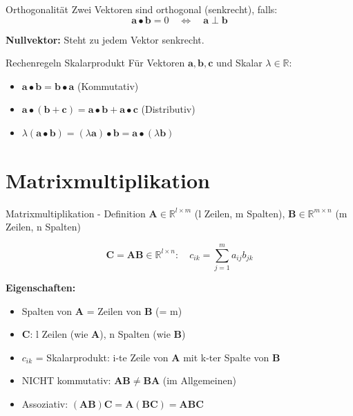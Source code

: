 \documentclass[a4paper, fontsize=7pt]{scrartcl}
\def\R{\mathbb{R}}
\begin{document}
\begin{mainbox}{Orthogonalität}
Zwei Vektoren sind orthogonal (senkrecht), falls:
$$\mathbf{a} \bullet \mathbf{b} = 0 \quad \Leftrightarrow \quad \mathbf{a} \perp \mathbf{b}$$

\textbf{Nullvektor:} Steht zu jedem Vektor senkrecht.
\end{mainbox}

\begin{subbox}{Rechenregeln Skalarprodukt}
Für Vektoren $\mathbf{a}, \mathbf{b}, \mathbf{c}$ und Skalar $\lambda \in \R$:

\begin{itemize}
    \item $\mathbf{a} \bullet \mathbf{b} = \mathbf{b} \bullet \mathbf{a}$ (Kommutativ)
    \item $\mathbf{a} \bullet (\mathbf{b} + \mathbf{c}) = \mathbf{a} \bullet \mathbf{b} + \mathbf{a} \bullet \mathbf{c}$ (Distributiv)
    \item $\lambda(\mathbf{a} \bullet \mathbf{b}) = (\lambda\mathbf{a}) \bullet \mathbf{b} = \mathbf{a} \bullet (\lambda\mathbf{b})$
\end{itemize}
\end{subbox}

\section{Matrixmultiplikation}

\begin{mainbox}{Matrixmultiplikation - Definition}
$\mathbf{A} \in \R^{l \times m}$ (l Zeilen, m Spalten), $\mathbf{B} \in \R^{m \times n}$ (m Zeilen, n Spalten)

$$\mathbf{C} = \mathbf{AB} \in \R^{l \times n}: \quad c_{ik} = \sum_{j=1}^{m} a_{ij}b_{jk}$$

\textbf{Eigenschaften:}
\begin{itemize}
    \item Spalten von $\mathbf{A}$ = Zeilen von $\mathbf{B}$ (= m)
    \item $\mathbf{C}$: l Zeilen (wie $\mathbf{A}$), n Spalten (wie $\mathbf{B}$)
    \item $c_{ik}$ = Skalarprodukt: i-te Zeile von $\mathbf{A}$ mit k-ter Spalte von $\mathbf{B}$
    \item NICHT kommutativ: $\mathbf{AB} \neq \mathbf{BA}$ (im Allgemeinen)
    \item Assoziativ: $(\mathbf{AB})\mathbf{C} = \mathbf{A}(\mathbf{BC}) = \mathbf{ABC}$
\end{itemize}
\end{mainbox}
\end{document}
